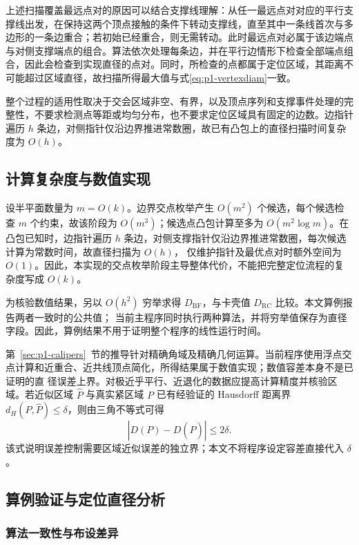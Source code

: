 上述扫描覆盖最远点对的原因可以结合支撑线理解：从任一最远点对对应的平行支撑线出发，在保持这两个顶点接触的条件下转动支撑线，直至其中一条线首次与多边形的一条边重合；若初始已经重合，则无需转动。此时最远点对必属于该边端点与对侧支撑端点的组合。算法依次处理每条边，并在平行边情形下检查全部端点组合，因此会检查到实现直径的点对。同时，所检查的点都属于定位区域，其距离不可能超过区域直径，故扫描所得最大值与式\eqref{eq:p1-vertexdiam}一致。

整个过程的适用性取决于交会区域非空、有界，以及顶点序列和支撑事件处理的完整性，不要求检测点等距或均匀分布，也不要求定位区域具有固定的边数。边指针遍历 $h$ 条边，对侧指针仅沿边界推进常数圈，故已有凸包上的直径扫描时间复杂度为 $O(h)$。

\subsection{计算复杂度与数值实现}

设半平面数量为 $m=O(k)$。边界交点枚举产生 $O(m^2)$ 个候选，每个候选检查 $m$ 个约束，故该阶段为 $O(m^3)$；候选点凸包计算至多为
 $O(m^2\log m)$。在凸包已知时，边指针遍历 $h$ 条边，对侧支撑指针仅沿边界推进常数圈，每次候选计算为常数时间，故直径扫描为 $O(h)$，
 仅维护指针及最优点对时额外空间为 $O(1)$。因此，本实现的交点枚举阶段主导整体代价，不能把完整定位流程的复杂度写成 $O(k)$。

为核验数值结果，另以 $O(h^2)$ 穷举求得 $D_{\mathrm{BF}}$，与卡壳值 $D_{\mathrm{RC}}$ 比较。本文算例报告两者一致时的公共值；
当前主程序同时执行两种算法，并将穷举值保存为直径字段。因此，算例结果不用于证明整个程序的线性运行时间。

第~\ref{sec:p1-calipers}~节的推导针对精确角域及精确几何运算。当前程序使用浮点交点计算和近重合、近共线顶点简化，所得结果属于数值实现；数值容差本身不是已证明的直
径误差上界。对极近乎平行、近退化的数据应提高计算精度并核验区域。若近似区域 $\widehat P$ 与真实紧区域 $P$ 已有经验证的 Hausdorff 
距离界 $d_H(P,\widehat P)\le\delta$，则由三角不等式可得
\begin{equation}
|D(P)-D(\widehat P)|\le2\delta.
\end{equation}
该式说明误差控制需要区域近似误差的独立界；本文不将程序设定容差直接代入 $\delta$。

\subsection{算例验证与定位直径分析}

\subsubsection{算法一致性与布设差异}

